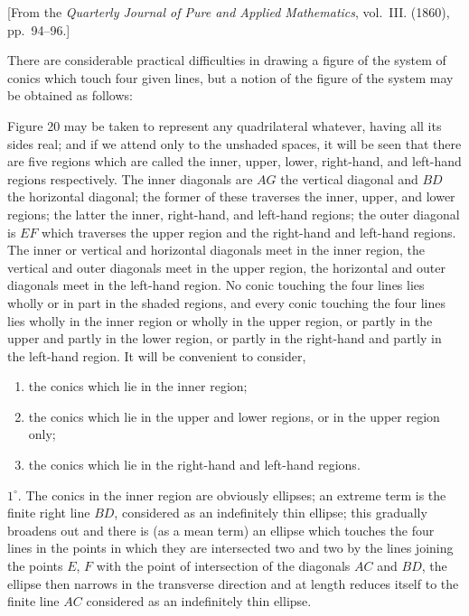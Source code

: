 \documentclass[11pt,a4paper]{book}
\begin{document}
[From the \textit{Quarterly Journal of Pure and Applied Mathematics}, vol.~III. (1860), pp.~94--96.]

There are considerable practical difficulties in drawing a figure of the system of conics which touch four given lines, but a notion of the figure of the system may be obtained as follows:

Figure 20 may be taken to represent any quadrilateral whatever, having all its sides real; and if we attend only to the unshaded spaces, it will be seen that there are five regions which are called the inner, upper, lower, right-hand, and left-hand regions respectively. The inner diagonals are $AG$ the vertical diagonal and $BD$ the horizontal diagonal; the former of these traverses the inner, upper, and lower regions; the latter the inner, right-hand, and left-hand regions; the outer diagonal is $EF$ which traverses the upper region and the right-hand and left-hand regions. The inner or vertical and horizontal diagonals meet in the inner region, the vertical and outer diagonals meet in the upper region, the horizontal and outer diagonals meet in the left-hand region. No conic touching the four lines lies wholly or in part in the shaded regions, and every conic touching the four lines lies wholly in the inner region or wholly in the upper region, or partly in the upper and partly in the lower region, or partly in the right-hand and partly in the left-hand region. It will be convenient to consider,
\begin{enumerate}
    \item[$1^\circ$] the conics which lie in the inner region;
    \item[$2^\circ$] the conics which lie in the upper and lower regions, or in the upper region only;
    \item[$3^\circ$] the conics which lie in the right-hand and left-hand regions.
\end{enumerate}

$1^\circ$. The conics in the inner region are obviously ellipses; an extreme term is the finite right line $BD$, considered as an indefinitely thin ellipse; this gradually broadens out and there is (as a mean term) an ellipse which touches the four lines in the points in which they are intersected two and two by the lines joining the points $E$, $F$ with the point of intersection of the diagonals $AC$ and $BD$, the ellipse then narrows in the transverse direction and at length reduces itself to the finite line $AC$ considered as an indefinitely thin ellipse.
\end{document}
